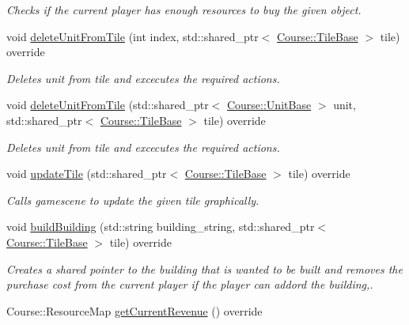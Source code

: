 \begin{DoxyCompactItemize}
\begin{DoxyCompactList}\small\item\em Checks if the current player has enough resources to buy the given object. \end{DoxyCompactList}\item 
void \hyperlink{class_student_1_1_game_event_handler_a4ee29863d407042502fd70ff7cbc1e7e}{delete\-Unit\-From\-Tile} (int index, std\-::shared\-\_\-ptr$<$ \hyperlink{class_course_1_1_tile_base}{Course\-::\-Tile\-Base} $>$ tile) override
\begin{DoxyCompactList}\small\item\em Deletes unit from tile and excecutes the required actions. \end{DoxyCompactList}\item 
void \hyperlink{class_student_1_1_game_event_handler_a74f6b50a3b8b54eee5813007654f0b3a}{delete\-Unit\-From\-Tile} (std\-::shared\-\_\-ptr$<$ \hyperlink{class_course_1_1_unit_base}{Course\-::\-Unit\-Base} $>$ unit, std\-::shared\-\_\-ptr$<$ \hyperlink{class_course_1_1_tile_base}{Course\-::\-Tile\-Base} $>$ tile) override
\begin{DoxyCompactList}\small\item\em Deletes unit from tile and excecutes the required actions. \end{DoxyCompactList}\item 
void \hyperlink{class_student_1_1_game_event_handler_ac4be736d89fc2efd095c3d781b539ede}{update\-Tile} (std\-::shared\-\_\-ptr$<$ \hyperlink{class_course_1_1_tile_base}{Course\-::\-Tile\-Base} $>$ tile) override
\begin{DoxyCompactList}\small\item\em Calls gamescene to update the given tile graphically. \end{DoxyCompactList}\item 
void \hyperlink{class_student_1_1_game_event_handler_a0b25328dd12bf6b3bf584c3772931b65}{build\-Building} (std\-::string building\-\_\-string, std\-::shared\-\_\-ptr$<$ \hyperlink{class_course_1_1_tile_base}{Course\-::\-Tile\-Base} $>$ tile) override
\begin{DoxyCompactList}\small\item\em Creates a shared pointer to the building that is wanted to be built and removes the purchase cost from the current player if the player can addord the building,. \end{DoxyCompactList}\item 
Course\-::\-Resource\-Map \hyperlink{class_student_1_1_game_event_handler_a285a4505308359e75d24f5f980b4e686}{get\-Current\-Revenue} () override

\end{DoxyCompactItemize}
